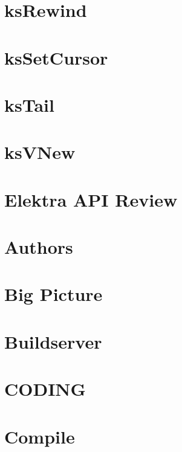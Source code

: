 \documentclass[twoside]{book}
\newcommand{\+}{\discretionary{\mbox{\scriptsize$\hookleftarrow$}}{}{}}
\begin{document}
\chapter{ks\+Rewind}
\label{doc_api_review_core_ksRewind_md}

\chapter{ks\+Set\+Cursor}
\label{doc_api_review_core_ksSetCursor_md}

\chapter{ks\+Tail}
\label{doc_api_review_core_ksTail_md}

\chapter{ks\+V\+New}
\label{doc_api_review_core_ksVNew_md}

\chapter{Elektra A\+PI Review}
\label{doc_api_review_README_md}

\chapter{Authors}
\label{doc_AUTHORS_md}

\chapter{Big Picture}
\label{doc_BIGPICTURE_md}

\chapter{Buildserver}
\label{doc_BUILDSERVER_md}

\chapter{C\+O\+D\+I\+NG}
\label{doc_CODING_md}

\chapter{Compile}
\label{doc_COMPILE_md}

\end{document}
